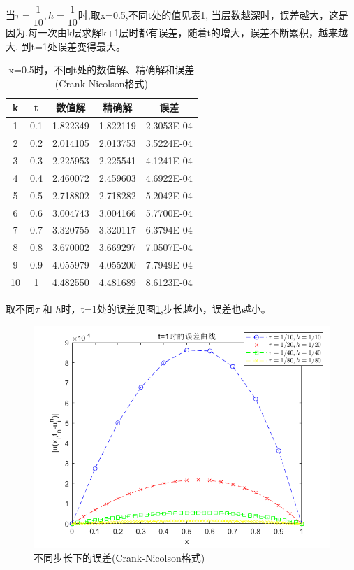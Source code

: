 \documentclass[withoutpreface,bwprint]{cumcmthesis} %
\begin{document}
当$\tau=\dfrac{1}{10},h=\dfrac{1}{10}$时,取x=0.5,不同t处的值见表\ref{tab:3},
当层数越深时，误差越大，这是因为,每一次由k层求解k+1层时都有误差，随着t的增大，误差不断累积，越来越大,
到t=1处误差变得最大。
\begin{table}[htbp]
	\centering
	\caption{x=0.5时，不同t处的数值解、精确解和误差(Crank-Nicolson格式)}
	\begin{tabular}{ccccc}
		\toprule[1.5pt]
		k     & t     & 数值解   & 精确解   & 误差 \\
		\midrule[1pt]
		1     & 0.1   & 1.822349  & 1.822119  & 2.3053E-04 \\
		2     & 0.2   & 2.014105  & 2.013753  & 3.5224E-04 \\
		3     & 0.3   & 2.225953  & 2.225541  & 4.1241E-04 \\
		4     & 0.4   & 2.460072  & 2.459603  & 4.6922E-04 \\
		5     & 0.5   & 2.718802  & 2.718282  & 5.2042E-04 \\
		6     & 0.6   & 3.004743  & 3.004166  & 5.7700E-04 \\
		7     & 0.7   & 3.320755  & 3.320117  & 6.3794E-04 \\
		8     & 0.8   & 3.670002  & 3.669297  & 7.0507E-04 \\
		9     & 0.9   & 4.055979  & 4.055200  & 7.7949E-04 \\
		10    & 1     & 4.482550  & 4.481689  & 8.6123E-04 \\
		\bottomrule[1.5pt]
	\end{tabular}%
	\label{tab:3}%
\end{table}%


取不同$\tau$ 和 $h$时，t=1处的误差见图\ref{fig:f4},步长越小，误差也越小。
\begin{figure}
	\centering
	\includegraphics[width=0.7\linewidth]{figures/f4}
	\caption{不同步长下的误差(Crank-Nicolson格式)}
	\label{fig:f4}
\end{figure}
\end{document}
